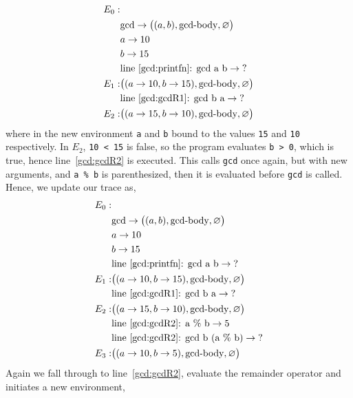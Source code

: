 \begin{align*}
  E_0:&\\
      & \text{gcd} \rightarrow \big((a, b), \text{gcd-body}, \varnothing\big)\\
      & a \rightarrow 10\\
      & b \rightarrow 15\\
      & \text{line~\ref{gcd:printfn}: gcd a b} \rightarrow \text{?}\\
  E_1:& \big((a \rightarrow 10, b \rightarrow 15), \text{gcd-body}, \varnothing\big)\\
      & \text{line~\ref{gcd:gcdR1}: gcd b a} \rightarrow \text{?}\\
  E_2:& \big((a \rightarrow 15, b \rightarrow 10), \text{gcd-body}, \varnothing\big)\\
\end{align*}
where in the new environment \lstinline!a! and \lstinline!b! bound to the values \lstinline!15! and \lstinline!10! respectively. In $E_2$, \lstinline!10 < 15! is false, so the program evaluates \lstinline!b > 0!, which is true, hence line~\ref{gcd:gcdR2} is executed. This calls \lstinline!gcd! once again, but with new arguments, and \lstinline{a % b} is parenthesized, then it is evaluated before \lstinline!gcd! is called. Hence, we update our trace as,
\begin{align*}
  E_0:&\\
      & \text{gcd} \rightarrow \big((a, b), \text{gcd-body}, \varnothing\big)\\
      & a \rightarrow 10\\
      & b \rightarrow 15\\
      & \text{line~\ref{gcd:printfn}: gcd a b} \rightarrow \text{?}\\
  E_1:& \big((a \rightarrow 10, b \rightarrow 15), \text{gcd-body}, \varnothing\big)\\
      & \text{line~\ref{gcd:gcdR1}: gcd b a} \rightarrow \text{?}\\
  E_2:& \big((a \rightarrow 15, b \rightarrow 10), \text{gcd-body}, \varnothing\big)\\
      & \text{line~\ref{gcd:gcdR2}: a \% b} \rightarrow 5\\
      & \text{line~\ref{gcd:gcdR2}: gcd b (a \% b)} \rightarrow \text{?}\\
  E_3:& \big((a \rightarrow 10, b \rightarrow 5), \text{gcd-body}, \varnothing\big)\\
\end{align*}
Again we fall through to line~\ref{gcd:gcdR2}, evaluate the remainder operator and initiates a new environment,

